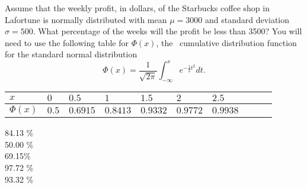 \documentclass[12pt]{amsart}
\begin{document}
\begin{exam}
\begin{problem}
Assume that the weekly profit, in dollars, of the Starbucks
coffee shop in Lafortune is normally distributed
with mean $\mu = 3000$ and standard 
deviation $\sigma = 500$.  What percentage of the
weeks will the profit be less than 3500?
You will need to use the following table for $ \Phi(x)$, the 
cumulative distribution function for
the standard normal distribution    
\[
\Phi(x) = \frac{1}{\sqrt{2\pi}}\int_{-\infty}^{x} e^{-\frac{1}{2}t^2} dt.
\]
\begin{center}
\begin{tabular}{|l|l|l|l|l|l|l|l|l|l|}
\hline
$x$       & $0$   & $0.5$    & $1$      & $1.5$    & 
            $2$      & $2.5$ \\ \hline
$\Phi(x)$  & $0.5$ & $0.6915$ & $0.8413$ & $0.9332$ &
            $0.9772$ & $0.9938$ \\
\hline
\end{tabular}
\end{center}
%
\begin{answers}{1}
84.13  \%  \\
50.00 \% \\
69.15\% \\
97.72 \% \\
93.32 \% \\
%
\end{answers}



\end{problem}















\end{exam}

\makemarkedanswersheet
\end{document}
